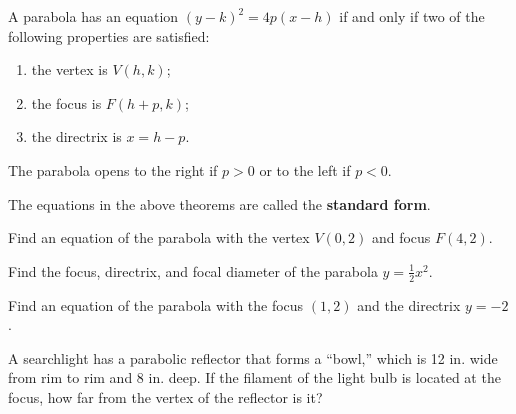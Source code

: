   \begin{theorem}
  A parabola has an equation $(y-k)^2=4p(x-h)$ if and only if two of the following properties are satisfied:
  \begin{enumerate}
      \item the vertex is $V(h, k)$;
      \item the focus is $F(h+p, k)$;
      \item the directrix is $x=h-p$.
  \end{enumerate}
  
  The parabola opens to the right if $p>0$ or to the left if $p<0$.
  \end{theorem}


  The equations in the above theorems are called the \textbf{standard form}.

\begin{example}
    Find an equation of the parabola with the vertex $V(0,2)$ and focus $F(4,2)$.
\end{example}

\newpage


\begin{example}
    Find the focus, directrix, and focal diameter of the parabola $y=\frac{1}{2}x^2$.
\end{example}


\begin{example}
  Find an equation of the parabola with the focus $(1, 2)$ and the directrix $y=-2$.
\end{example}

\newpage

\begin{example}
A searchlight has a parabolic reflector that forms a “bowl,” which is 12 in. wide from rim to rim and 8 in. deep.  If the filament of the light bulb is located at the focus, how far from the vertex of the reflector is it?
\end{example}

